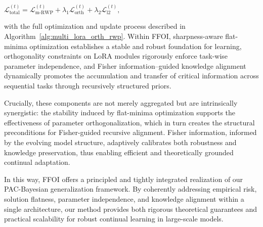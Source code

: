 \documentclass[letterpaper]{article} %
\begin{document}
$\mathcal{L}_{\text{total}}^{(t)} = \mathcal{L}_{\mathrm{m\text{-}RWP}}^{(t)} + \lambda_1 \mathcal{L}_{\text{orth}}^{(t)} + \lambda_2 \mathcal{L}_{\text{l2}}^{(t)},$

with the full optimization and update process described in Algorithm~\ref{alg:multi_lora_orth_rwp}. Within FFOI, sharpness-aware flat-minima optimization establishes a stable and robust foundation for learning, orthogonality constraints on LoRA modules rigorously enforce task-wise parameter independence, and Fisher information–guided knowledge alignment dynamically promotes the accumulation and transfer of critical information across sequential tasks through recursively structured priors.

Crucially, these components are not merely aggregated but are intrinsically synergistic: the stability induced by flat-minima optimization supports the effectiveness of parameter orthogonalization, which in turn creates the structural preconditions for Fisher-guided recursive alignment. Fisher information, informed by the evolving model structure, adaptively calibrates both robustness and knowledge preservation, thus enabling efficient and theoretically grounded continual adaptation.

In this way, FFOI offers a principled and tightly integrated realization of our PAC-Bayesian generalization framework. By coherently addressing empirical risk, solution flatness, parameter independence, and knowledge alignment within a single architecture, our method provides both rigorous theoretical guarantees and practical scalability for robust continual learning in large-scale models.
\end{document}
